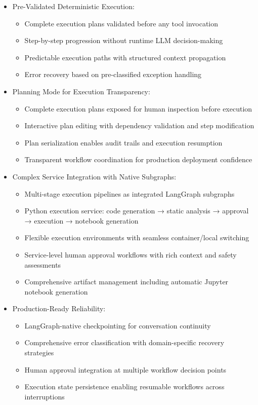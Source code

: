 \begin{itemize}
    \item Pre-Validated Deterministic Execution:
    \begin{itemize}
        \item Complete execution plans validated before any tool invocation
        \item Step-by-step progression without runtime LLM decision-making
        \item Predictable execution paths with structured context propagation
        \item Error recovery based on pre-classified exception handling
    \end{itemize}
    
    \item Planning Mode for Execution Transparency:
    \begin{itemize}
        \item Complete execution plans exposed for human inspection before execution
        \item Interactive plan editing with dependency validation and step modification
        \item Plan serialization enables audit trails and execution resumption
        \item Transparent workflow coordination for production deployment confidence
    \end{itemize}
    
    \item Complex Service Integration with Native Subgraphs:
    \begin{itemize}
        \item Multi-stage execution pipelines as integrated LangGraph subgraphs
        \item Python execution service: code generation → static analysis → approval → execution → notebook generation
        \item Flexible execution environments with seamless container/local switching
        \item Service-level human approval workflows with rich context and safety assessments
        \item Comprehensive artifact management including automatic Jupyter notebook generation
    \end{itemize}
    
    \item Production-Ready Reliability:
    \begin{itemize}
        \item LangGraph-native checkpointing for conversation continuity
        \item Comprehensive error classification with domain-specific recovery strategies
        \item Human approval integration at multiple workflow decision points
        \item Execution state persistence enabling resumable workflows across interruptions
    \end{itemize}


\end{itemize}
